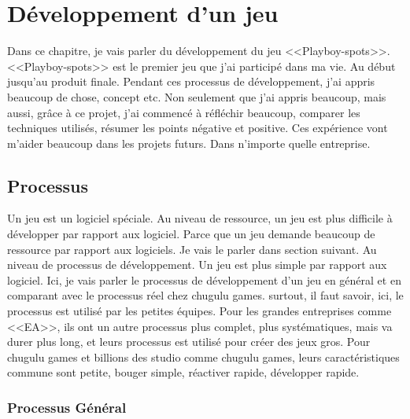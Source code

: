 \chapter{Développement d'un jeu} %
\label{cha:développement_d_un_jeu}

Dans ce chapitre, je vais parler du développement du jeu <<Playboy-spots>>. <<Playboy-spots>> est le premier jeu que j'ai participé dans ma vie. Au début jusqu'au produit finale. Pendant ces processus de développement, j'ai appris beaucoup de chose, concept etc. Non seulement que j'ai appris beaucoup, mais aussi, grâce à ce projet, j'ai commencé à réfléchir beaucoup, comparer les techniques utilisés, résumer les points négative et positive. Ces expérience vont m'aider beaucoup dans les projets futurs. Dans n'importe quelle entreprise.

\section{Processus} %
\label{sec:processus}

Un jeu est un logiciel spéciale. Au niveau de ressource, un jeu est plus difficile à développer par rapport aux logiciel. Parce que un jeu demande beaucoup de ressource par rapport aux logiciels. Je vais le parler dans section suivant. Au niveau de processus de développement. Un jeu est plus simple par rapport aux logiciel. Ici, je vais parler le processus de développement d'un jeu en général et en comparant avec le processus réel chez chugulu games. surtout, il faut savoir, ici, le processus est utilisé par les petites équipes. Pour les grandes entreprises comme <<EA>>, ils ont un autre processus plus complet, plus systématiques, mais va durer plus long, et leurs processus est utilisé pour créer des jeux gros. Pour chugulu games et billions des studio comme chugulu games, leurs caractéristiques commune sont petite, bouger simple, réactiver rapide, développer rapide. 

\subsection{Processus Général} %
\label{sub:processus_général}





